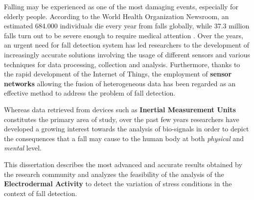 \label{ch:introduction}

Falling may be experienced as one of the most damaging events, especially for elderly people. According to the World Health Organization Newsroom, an estimated 684.000 individuals die every year from falls globally, while 37.3 million falls turn out to be severe enough to require medical attention \cite{WhoData}. 
Over the years, an urgent need for fall detection system has led researchers to the development of increasingly accurate solutions involving the usage of different sensors and various techniques for data processing, collection and analysis.
Furthermore, thanks to the rapid development of the Internet of Things, the employment of \textbf{sensor networks} allowing the fusion of heterogeneous data has been regarded as an effective method to address the problem of fall detection.

Whereas data retrieved from devices such as \textbf{Inertial Measurement Units} constitutes the primary area of study, over the past few years researchers have developed a growing interest towards the analysis of bio-signals in order to depict the consequences that a fall may cause to the human body at both \textit{physical} and \textit{mental} level.

This dissertation describes the most advanced and accurate results obtained by the research community and analyzes the feasibility of the analysis of the \textbf{Electrodermal Activity} to detect the variation of stress conditions in the context of fall detection. 

